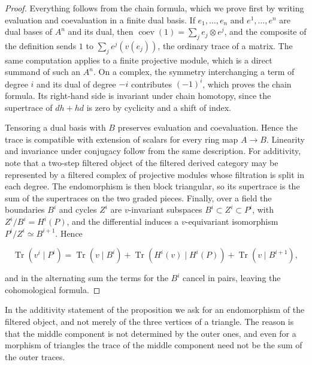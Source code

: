 \documentclass[11pt]{article}
\begin{document}
\begin{proof}[{Proof}]\label{bp177}%
Everything follows from the chain formula, which we prove first by writing evaluation and coevaluation in a finite dual basis. If \(e_1,\dots,e_n\) and \(e^1,\dots,e^n\) are dual bases of \(A^n\) and its dual, then \(\operatorname{coev}(1)=\sum_je_j\otimes e^j\), and the composite of the definition sends \(1\) to \(\sum_je^j(v(e_j))\), the ordinary trace of a matrix. The same computation applies to a finite projective module, which is a direct summand of such an \(A^n\). On a complex, the symmetry interchanging a term of degree \(i\) and its dual of degree \(-i\) contributes \((-1)^i\), which proves the chain formula. Its right-hand side is invariant under chain homotopy, since the supertrace of \(dh+hd\) is zero by cyclicity and a shift of index.

Tensoring a dual basis with \(B\) preserves evaluation and coevaluation. Hence the trace is compatible with extension of scalars for every ring map \(A\to B\). Linearity and invariance under conjugacy follow from the same description. For additivity, note that a two-step filtered object of the filtered derived category may be represented by a filtered complex of projective modules whose filtration is split in each degree. The endomorphism is then block triangular, so its supertrace is the sum of the supertraces on the two graded pieces. Finally, over a field the boundaries \(B^i\) and cycles \(Z^i\) are \(v\)-invariant subspaces \(B^i\subset Z^i\subset P^i\), with \(Z^i/B^i=H^i(P)\), and the differential induces a \(v\)-equivariant isomorphism \(P^i/Z^i\simeq B^{i+1}\). Hence

\[
\operatorname{Tr}(v^i\mid P^i)=\operatorname{Tr}(v\mid B^i)
+\operatorname{Tr}(H^i(v)\mid H^i(P))+\operatorname{Tr}(v\mid B^{i+1}),
\]

and in the alternating sum the terms for the \(B^i\) cancel in pairs, leaving the cohomological formula.
\end{proof}

\label{bp178}%
In the additivity statement of the proposition we ask for an endomorphism of the filtered object, and not merely of the three vertices of a triangle. The reason is that the middle component is not determined by the outer ones, and even for a morphism of triangles the trace of the middle component need not be the sum of the outer traces.
\end{document}
